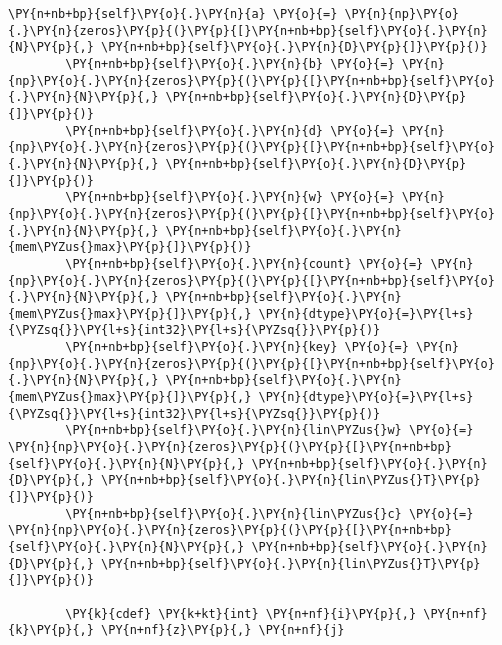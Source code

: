 \begin{Verbatim}[commandchars=\\\{\}]
        \PY{n+nb+bp}{self}\PY{o}{.}\PY{n}{a} \PY{o}{=} \PY{n}{np}\PY{o}{.}\PY{n}{zeros}\PY{p}{(}\PY{p}{[}\PY{n+nb+bp}{self}\PY{o}{.}\PY{n}{N}\PY{p}{,} \PY{n+nb+bp}{self}\PY{o}{.}\PY{n}{D}\PY{p}{]}\PY{p}{)} 
        \PY{n+nb+bp}{self}\PY{o}{.}\PY{n}{b} \PY{o}{=} \PY{n}{np}\PY{o}{.}\PY{n}{zeros}\PY{p}{(}\PY{p}{[}\PY{n+nb+bp}{self}\PY{o}{.}\PY{n}{N}\PY{p}{,} \PY{n+nb+bp}{self}\PY{o}{.}\PY{n}{D}\PY{p}{]}\PY{p}{)}
        \PY{n+nb+bp}{self}\PY{o}{.}\PY{n}{d} \PY{o}{=} \PY{n}{np}\PY{o}{.}\PY{n}{zeros}\PY{p}{(}\PY{p}{[}\PY{n+nb+bp}{self}\PY{o}{.}\PY{n}{N}\PY{p}{,} \PY{n+nb+bp}{self}\PY{o}{.}\PY{n}{D}\PY{p}{]}\PY{p}{)}
        \PY{n+nb+bp}{self}\PY{o}{.}\PY{n}{w} \PY{o}{=} \PY{n}{np}\PY{o}{.}\PY{n}{zeros}\PY{p}{(}\PY{p}{[}\PY{n+nb+bp}{self}\PY{o}{.}\PY{n}{N}\PY{p}{,} \PY{n+nb+bp}{self}\PY{o}{.}\PY{n}{mem\PYZus{}max}\PY{p}{]}\PY{p}{)}
        \PY{n+nb+bp}{self}\PY{o}{.}\PY{n}{count} \PY{o}{=} \PY{n}{np}\PY{o}{.}\PY{n}{zeros}\PY{p}{(}\PY{p}{[}\PY{n+nb+bp}{self}\PY{o}{.}\PY{n}{N}\PY{p}{,} \PY{n+nb+bp}{self}\PY{o}{.}\PY{n}{mem\PYZus{}max}\PY{p}{]}\PY{p}{,} \PY{n}{dtype}\PY{o}{=}\PY{l+s}{\PYZsq{}}\PY{l+s}{int32}\PY{l+s}{\PYZsq{}}\PY{p}{)}
        \PY{n+nb+bp}{self}\PY{o}{.}\PY{n}{key} \PY{o}{=} \PY{n}{np}\PY{o}{.}\PY{n}{zeros}\PY{p}{(}\PY{p}{[}\PY{n+nb+bp}{self}\PY{o}{.}\PY{n}{N}\PY{p}{,} \PY{n+nb+bp}{self}\PY{o}{.}\PY{n}{mem\PYZus{}max}\PY{p}{]}\PY{p}{,} \PY{n}{dtype}\PY{o}{=}\PY{l+s}{\PYZsq{}}\PY{l+s}{int32}\PY{l+s}{\PYZsq{}}\PY{p}{)}
        \PY{n+nb+bp}{self}\PY{o}{.}\PY{n}{lin\PYZus{}w} \PY{o}{=} \PY{n}{np}\PY{o}{.}\PY{n}{zeros}\PY{p}{(}\PY{p}{[}\PY{n+nb+bp}{self}\PY{o}{.}\PY{n}{N}\PY{p}{,} \PY{n+nb+bp}{self}\PY{o}{.}\PY{n}{D}\PY{p}{,} \PY{n+nb+bp}{self}\PY{o}{.}\PY{n}{lin\PYZus{}T}\PY{p}{]}\PY{p}{)}
        \PY{n+nb+bp}{self}\PY{o}{.}\PY{n}{lin\PYZus{}c} \PY{o}{=} \PY{n}{np}\PY{o}{.}\PY{n}{zeros}\PY{p}{(}\PY{p}{[}\PY{n+nb+bp}{self}\PY{o}{.}\PY{n}{N}\PY{p}{,} \PY{n+nb+bp}{self}\PY{o}{.}\PY{n}{D}\PY{p}{,} \PY{n+nb+bp}{self}\PY{o}{.}\PY{n}{lin\PYZus{}T}\PY{p}{]}\PY{p}{)}

        \PY{k}{cdef} \PY{k+kt}{int} \PY{n+nf}{i}\PY{p}{,} \PY{n+nf}{k}\PY{p}{,} \PY{n+nf}{z}\PY{p}{,} \PY{n+nf}{j}


\end{Verbatim}
